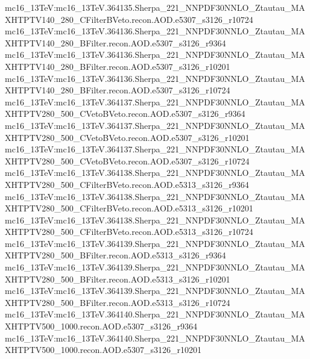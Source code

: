{ mc16\_13TeV:mc16\_13TeV.364135.Sherpa\_221\_NNPDF30NNLO\_Ztautau\_MAXHTPTV140\_280\_CFilterBVeto.recon.AOD.e5307\_s3126\_r10724 \newline  
 mc16\_13TeV:mc16\_13TeV.364136.Sherpa\_221\_NNPDF30NNLO\_Ztautau\_MAXHTPTV140\_280\_BFilter.recon.AOD.e5307\_s3126\_r9364 \newline  
 mc16\_13TeV:mc16\_13TeV.364136.Sherpa\_221\_NNPDF30NNLO\_Ztautau\_MAXHTPTV140\_280\_BFilter.recon.AOD.e5307\_s3126\_r10201 \newline  
 mc16\_13TeV:mc16\_13TeV.364136.Sherpa\_221\_NNPDF30NNLO\_Ztautau\_MAXHTPTV140\_280\_BFilter.recon.AOD.e5307\_s3126\_r10724 \newline  
 mc16\_13TeV:mc16\_13TeV.364137.Sherpa\_221\_NNPDF30NNLO\_Ztautau\_MAXHTPTV280\_500\_CVetoBVeto.recon.AOD.e5307\_s3126\_r9364   \newline
 mc16\_13TeV:mc16\_13TeV.364137.Sherpa\_221\_NNPDF30NNLO\_Ztautau\_MAXHTPTV280\_500\_CVetoBVeto.recon.AOD.e5307\_s3126\_r10201 \newline  
 mc16\_13TeV:mc16\_13TeV.364137.Sherpa\_221\_NNPDF30NNLO\_Ztautau\_MAXHTPTV280\_500\_CVetoBVeto.recon.AOD.e5307\_s3126\_r10724 \newline  
 mc16\_13TeV:mc16\_13TeV.364138.Sherpa\_221\_NNPDF30NNLO\_Ztautau\_MAXHTPTV280\_500\_CFilterBVeto.recon.AOD.e5313\_s3126\_r9364 \newline  
 mc16\_13TeV:mc16\_13TeV.364138.Sherpa\_221\_NNPDF30NNLO\_Ztautau\_MAXHTPTV280\_500\_CFilterBVeto.recon.AOD.e5313\_s3126\_r10201 \newline  
 mc16\_13TeV:mc16\_13TeV.364138.Sherpa\_221\_NNPDF30NNLO\_Ztautau\_MAXHTPTV280\_500\_CFilterBVeto.recon.AOD.e5313\_s3126\_r10724  \newline 
 mc16\_13TeV:mc16\_13TeV.364139.Sherpa\_221\_NNPDF30NNLO\_Ztautau\_MAXHTPTV280\_500\_BFilter.recon.AOD.e5313\_s3126\_r9364\newline   
 mc16\_13TeV:mc16\_13TeV.364139.Sherpa\_221\_NNPDF30NNLO\_Ztautau\_MAXHTPTV280\_500\_BFilter.recon.AOD.e5313\_s3126\_r10201\newline   
 mc16\_13TeV:mc16\_13TeV.364139.Sherpa\_221\_NNPDF30NNLO\_Ztautau\_MAXHTPTV280\_500\_BFilter.recon.AOD.e5313\_s3126\_r10724 \newline  
 mc16\_13TeV:mc16\_13TeV.364140.Sherpa\_221\_NNPDF30NNLO\_Ztautau\_MAXHTPTV500\_1000.recon.AOD.e5307\_s3126\_r9364 \newline  
 mc16\_13TeV:mc16\_13TeV.364140.Sherpa\_221\_NNPDF30NNLO\_Ztautau\_MAXHTPTV500\_1000.recon.AOD.e5307\_s3126\_r10201 \newline  
}

